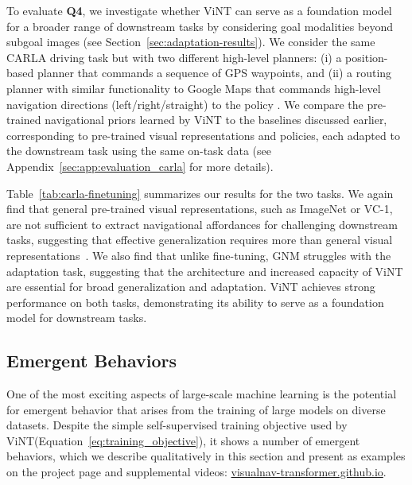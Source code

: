 \documentclass{article}
\newcommand{\ModelName}{ViNT\xspace}
\newcommand{\basement}{foundation\xspace}
\newcommand{\projectpage}[0]{\href{https://visualnav-transformer.github.io}{visualnav-transformer.github.io}}
\begin{document}
To evaluate \textbf{Q4}, we investigate whether \ModelName can serve as a \basement model for a broader range of downstream tasks by considering goal modalities beyond subgoal images (see Section~\ref{sec:adaptation-results}). We consider the same CARLA driving task but with two different high-level planners: (i) a position-based planner that commands a sequence of GPS waypoints, and (ii) a routing planner with similar functionality to Google Maps that commands high-level navigation directions (left/right/straight) to the policy \cite{Codevilla2017CIL}.
We compare the pre-trained navigational priors learned by \ModelName to the baselines discussed earlier, corresponding to pre-trained visual representations and policies, each adapted to the downstream task using the same on-task data (see Appendix~\ref{sec:app:evaluation_carla} for more details).



Table~\ref{tab:carla-finetuning} summarizes our results for the two tasks. We again find that general pre-trained visual representations, such as ImageNet or VC-1, are not sufficient to extract navigational affordances for challenging downstream tasks, suggesting that effective generalization requires more than general visual representations~\cite{parisi2022unsurprising, majumdar2023vc1}. We also find that unlike fine-tuning, GNM \cite{shah2022gnm} struggles with the adaptation task, suggesting that the architecture and increased capacity of \ModelName are essential for broad generalization and adaptation. \ModelName achieves strong performance on both tasks, demonstrating its ability to serve as a \basement model for downstream tasks.


\subsection{Emergent Behaviors}
\label{sec:emergent}

One of the most exciting aspects of large-scale machine learning is the potential for emergent behavior that arises from the training of large models on diverse datasets. Despite the simple self-supervised training objective used by \ModelName (Equation~\ref{eq:training_objective}), it shows a number of emergent behaviors, which we describe qualitatively in this section and present as examples on the project page and supplemental videos: \projectpage.
\end{document}
